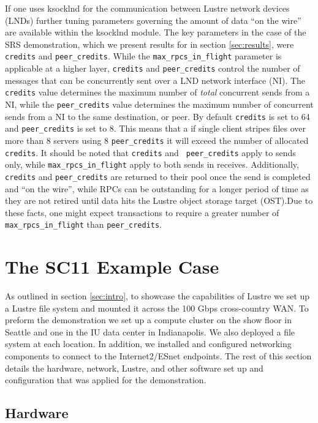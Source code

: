 \documentclass[]{sigplan-proc}
\begin{document}
If one uses ksocklnd for the communication between Lustre network devices (LNDs) further tuning parameters
governing the amount of data ``on the wire'' are available within the ksocklnd module. The key parameters in
the case of the SRS demonstration, which we present results for in section \ref{sec:results}, were 
{\tt credits} and {\tt peer\_credits}. While the {\tt max\_rpcs\_in\_flight} parameter is applicable at a higher
layer, {\tt credits} and {\tt peer\_credits} control the number of messages that can be concurrently sent over
a LND network interface (NI). The {\tt credits} value determines the maximum number of {\it total} concurrent
sends from a NI, while the {\tt peer\_credits} value determines the maximum number of concurrent sends from a
NI to the same destination, or peer. By default {\tt credits} is set to 64 and {\tt peer\_credits} is set to
8. This means that a if single client stripes files over more than 8 servers using 8 {\tt peer\_credits} it
will exceed the number of allocated {\tt credits}. It should be noted that {\tt credits} and {\tt
  peer\_credits} apply to sends only, while {\tt max\_rpcs\_in\_flight} apply to both sends in
receives. Additionally, {\tt credits} and {\tt peer\_credits} are returned to their pool once the send is
completed and ``on the wire'', while RPCs can be outstanding for a longer period of time as they are not
retired until data hits the Lustre object storage target (OST).Due to these facts, one might expect
transactions to require a greater number of {\tt max\_rpcs\_in\_flight} than {\tt peer\_credits}.
 

\section {The SC11 Example Case}\label{sec:usecase}

As outlined in section \ref{sec:intro}, to showcase the capabilities of Lustre we set up a Lustre
file system and mounted it across the 100 Gbps cross-country WAN. To preform the demonstration we set up a
compute cluster on the show floor in Seattle and one in the IU data center in Indianapolis. We also deployed a
file system at each location. In addition, we installed and configured networking components to connect to the
Internet2/ESnet endpoints. The rest of this section details the hardware, network, Lustre, and other software
set up and configuration that was applied for the demonstration.

\subsection{Hardware}\label{sec:hardware}
\end{document}
